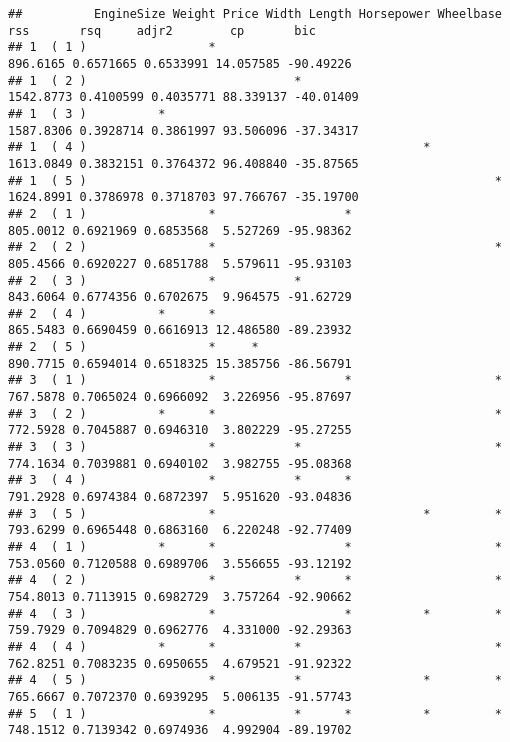 \documentclass[
]{book}
\begin{document}
\begin{verbatim}
##          EngineSize Weight Price Width Length Horsepower Wheelbase       rss       rsq     adjr2        cp       bic
## 1  ( 1 )                 *                                          896.6165 0.6571665 0.6533991 14.057585 -90.49226
## 1  ( 2 )                             *                             1542.8773 0.4100599 0.4035771 88.339137 -40.01409
## 1  ( 3 )          *                                                1587.8306 0.3928714 0.3861997 93.506096 -37.34317
## 1  ( 4 )                                               *           1613.0849 0.3832151 0.3764372 96.408840 -35.87565
## 1  ( 5 )                                                         * 1624.8991 0.3786978 0.3718703 97.766767 -35.19700
## 2  ( 1 )                 *                  *                       805.0012 0.6921969 0.6853568  5.527269 -95.98362
## 2  ( 2 )                 *                                       *  805.4566 0.6920227 0.6851788  5.579611 -95.93103
## 2  ( 3 )                 *           *                              843.6064 0.6774356 0.6702675  9.964575 -91.62729
## 2  ( 4 )          *      *                                          865.5483 0.6690459 0.6616913 12.486580 -89.23932
## 2  ( 5 )                 *     *                                    890.7715 0.6594014 0.6518325 15.385756 -86.56791
## 3  ( 1 )                 *                  *                    *  767.5878 0.7065024 0.6966092  3.226956 -95.87697
## 3  ( 2 )          *      *                                       *  772.5928 0.7045887 0.6946310  3.802229 -95.27255
## 3  ( 3 )                 *           *                           *  774.1634 0.7039881 0.6940102  3.982755 -95.08368
## 3  ( 4 )                 *           *      *                       791.2928 0.6974384 0.6872397  5.951620 -93.04836
## 3  ( 5 )                 *                             *         *  793.6299 0.6965448 0.6863160  6.220248 -92.77409
## 4  ( 1 )          *      *                  *                    *  753.0560 0.7120588 0.6989706  3.556655 -93.12192
## 4  ( 2 )                 *           *      *                    *  754.8013 0.7113915 0.6982729  3.757264 -92.90662
## 4  ( 3 )                 *                  *          *         *  759.7929 0.7094829 0.6962776  4.331000 -92.29363
## 4  ( 4 )          *      *           *                           *  762.8251 0.7083235 0.6950655  4.679521 -91.92322
## 4  ( 5 )                 *           *                 *         *  765.6667 0.7072370 0.6939295  5.006135 -91.57743
## 5  ( 1 )                 *           *      *          *         *  748.1512 0.7139342 0.6974936  4.992904 -89.19702

\end{verbatim}
\end{document}
